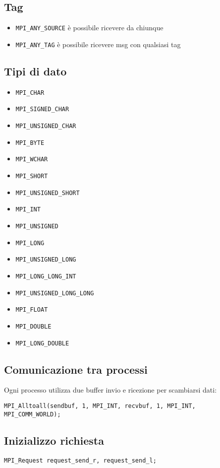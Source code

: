 \documentclass[a4paper,12pt]{article}
\begin{document}
\subsection{Tag}
\begin{itemize}
    \item \texttt{MPI\_ANY\_SOURCE} è possibile ricevere da chiunque
    \item \texttt{MPI\_ANY\_TAG} è possibile ricevere msg con qualsiasi tag
\end{itemize}

\subsection{Tipi di dato}
\begin{itemize}
    \item \texttt{MPI\_CHAR}
    \item \texttt{MPI\_SIGNED\_CHAR}
    \item \texttt{MPI\_UNSIGNED\_CHAR}
    \item \texttt{MPI\_BYTE}
    \item \texttt{MPI\_WCHAR}
    \item \texttt{MPI\_SHORT}
    \item \texttt{MPI\_UNSIGNED\_SHORT}
    \item \texttt{MPI\_INT}
    \item \texttt{MPI\_UNSIGNED}
    \item \texttt{MPI\_LONG}
    \item \texttt{MPI\_UNSIGNED\_LONG}
    \item \texttt{MPI\_LONG\_LONG\_INT}
    \item \texttt{MPI\_UNSIGNED\_LONG\_LONG}
    \item \texttt{MPI\_FLOAT}
    \item \texttt{MPI\_DOUBLE}
    \item \texttt{MPI\_LONG\_DOUBLE}
\end{itemize}

\subsection{Comunicazione tra processi}
Ogni processo utilizza due buffer invio e ricezione per scambiarsi dati:
\begin{verbatim}
MPI_Alltoall(sendbuf, 1, MPI_INT, recvbuf, 1, MPI_INT, MPI_COMM_WORLD);
\end{verbatim}

\subsection{Inizializzo richiesta}
\begin{verbatim}
MPI_Request request_send_r, request_send_l;
\end{verbatim}
\end{document}
